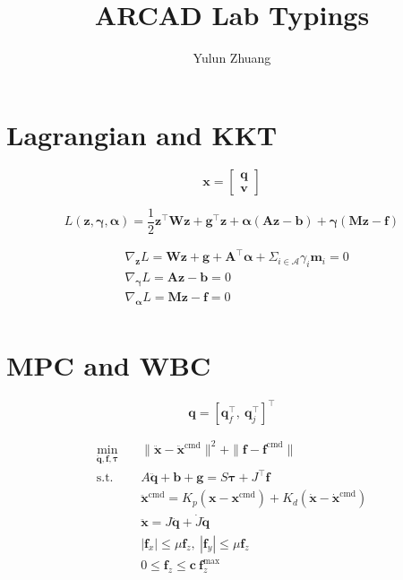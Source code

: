 \documentclass[11pt]{article}
\newcommand{\grad}{\nabla}
\newcommand{\half}{\frac{1}{2}} %
\newcommand{\T}{^\top}          %
\begin{document}
\title{ARCAD Lab Typings}
\author{Yulun Zhuang}
\maketitle
\section*{Lagrangian and KKT}


\[
\bm x = 
\begin{bmatrix}
    \bm q \\ \bm v
\end{bmatrix}
\]

\[
L(\bm z, \bm \gamma, \bm \alpha) = \half \bm z\T \bm W\bm z + \bm g\T \bm z + \bm \alpha (\bm A\bm z - \bm b) + \bm \gamma (\bm M\bm z - \bm f)
\]
    
\begin{align*}
    & \grad_{\bm z} L = \bm W \bm z + \bm g +\bm A\T\bm \alpha+ \Sigma_{i\in\mathcal{A}}\gamma_i \bm m_i = 0\\
    & \grad_{\bm \gamma} L = \bm A\bm z - \bm b = 0\\
    & \grad_{\bm \alpha} L = \bm M\bm z - \bm f = 0\\
\end{align*}

\clearpage

\section*{MPC and WBC}

\[
\bm{q} = [\bm{q}_f\T,\ \bm{q}_j\T]\T
\]

\begin{align*}
  \min_{\ddot{\bm{q}}, \mathbf{f}, \bm{\tau}} \quad
  & \|\ddot{\mathbf{x}} - \ddot{\mathbf{x}}^{\text{cmd}}\|^2 + 
  \|\mathbf{f} - \mathbf{f}^{\text{cmd}}\|\\
  \text{s.t.} \quad
  & A \ddot{\bm{q}} + \bm{b} + \bm{g} = S \bm{\tau} + J\T \mathbf{f}\\
  & \ddot{\mathbf{x}}^{\text{cmd}} = K_p (\mathbf{x} - \mathbf{x}^{\text{cmd}}) + K_d (\dot{\mathbf{x}} - \dot{\mathbf{x}}^{\text{cmd}})\\
  & \ddot{\mathbf{x}} = J\ddot{\bm{q}} + \dot{J} \dot{\bm{q}}\\
  & |\mathbf{f}_{x}| \leq \mu \mathbf{f}_{z}, \ 
  |\mathbf{f}_{y}| \leq \mu \mathbf{f}_{z}\\
  & 0 \leq \mathbf{f}_{z} \leq  \mathbf{c} \ \mathbf{f}_{z}^{\text{max}}
\end{align*}
\end{document}
